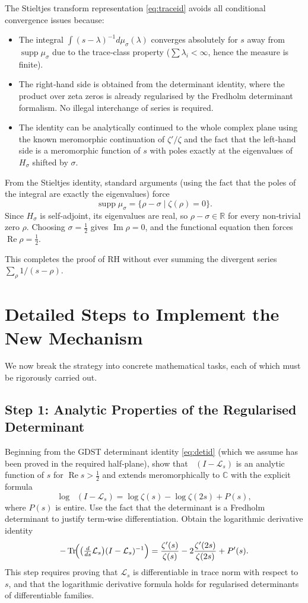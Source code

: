 \documentclass[11pt,a4paper]{article}
\newcommand{\C}{\mathbb{C}}
\newcommand{\R}{\mathbb{R}}
\newcommand{\LOp}{\mathcal{L}}
\newcommand{\supp}{\operatorname{supp}}
\newcommand{\Tr}{\operatorname{Tr}}
\newcommand{\RE}{\operatorname{Re}}
\newcommand{\IM}{\operatorname{Im}}
\DeclareMathOperator{\detreg}{det_{(2)}}
\begin{document}
The Stieltjes transform representation \eqref{eq:traceid} avoids all conditional convergence issues because:
\begin{itemize}[nosep]
\item The integral \(\int (s-\lambda)^{-1} d\mu_\sigma(\lambda)\) converges absolutely for \(s\) away from \(\supp\mu_\sigma\) due to the trace‑class property (\(\sum \lambda_i < \infty\), hence the measure is finite).
\item The right‑hand side is obtained from the determinant identity, where the product over zeta zeros is already regularised by the Fredholm determinant formalism. No illegal interchange of series is required.
\item The identity can be analytically continued to the whole complex plane using the known meromorphic continuation of \(\zeta'/\zeta\) and the fact that the left‑hand side is a meromorphic function of \(s\) with poles exactly at the eigenvalues of \(H_\sigma\) shifted by \(\sigma\).
\end{itemize}

From the Stieltjes identity, standard arguments (using the fact that the poles of the integral are exactly the eigenvalues) force
\[
\supp\mu_\sigma = \{ \rho - \sigma \mid \zeta(\rho) = 0 \}.
\]
Since \(H_\sigma\) is self‑adjoint, its eigenvalues are real, so \(\rho - \sigma \in \R\) for every non‑trivial zero \(\rho\). Choosing \(\sigma = \frac12\) gives \(\IM\rho = 0\), and the functional equation then forces \(\RE\rho = \frac12\).

This completes the proof of RH without ever summing the divergent series \(\sum_\rho 1/(s-\rho)\).

\section{Detailed Steps to Implement the New Mechanism}

We now break the strategy into concrete mathematical tasks, each of which must be rigorously carried out.

\subsection{Step 1: Analytic Properties of the Regularised Determinant}
Beginning from the GDST determinant identity \eqref{eq:detid} (which we assume has been proved in the required half‑plane), show that \(\detreg(I - \LOp_s)\) is an analytic function of \(s\) for \(\RE s > \frac12\) and extends meromorphically to \(\C\) with the explicit formula
\[
\log \detreg(I - \LOp_s) = \log \zeta(s) - \log \zeta(2s) + P(s),
\]
where \(P(s)\) is entire. Use the fact that the determinant is a Fredholm determinant to justify term‑wise differentiation. Obtain the logarithmic derivative identity
\begin{equation}\label{eq:logderiv}
- \Tr\!\Bigl( \bigl(\tfrac{d}{ds}\LOp_s\bigr) (I - \LOp_s)^{-1} \Bigr) = \frac{\zeta'(s)}{\zeta(s)} - 2\frac{\zeta'(2s)}{\zeta(2s)} + P'(s).
\end{equation}
This step requires proving that \(\LOp_s\) is differentiable in trace norm with respect to \(s\), and that the logarithmic derivative formula holds for regularised determinants of differentiable families.
\end{document}
